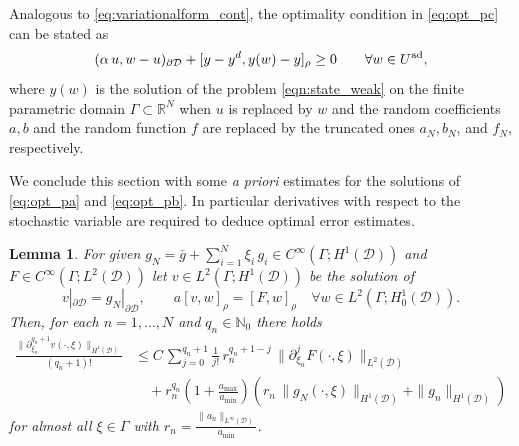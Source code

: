 \documentclass[a4paper,10pt]{article}
\newcommand{\cD}{{\mathcal{D}}}
\newtheorem{lemma}[theorem]{Lemma}
\numberwithin{theorem}{section}
\begin{document}
Analogous to \eqref{eq:variationalform_cont}, the optimality condition in \eqref{eq:opt_pc} can be stated as
\begin{equation}\label{eq:variationalform_parametric}
    ( \alpha \, u, w-u)_{\partial \cD} + [y-y^d, y(w) - y]_{\rho}  \geq 0 \qquad \forall w \in U^{\textup{ad}},
\end{equation}
where $y(w)$ is the solution of the problem \eqref{eqn:state_weak} on the finite parametric domain $\Gamma \subset \mathbb{R}^N$ when $u$ is replaced by $w$ and the random coefficients $a, b$ and the random function $f$ are replaced by the truncated ones  $a_N, b_N$, and $f_N$, respectively.

We conclude this section with some \emph{a priori} estimates for the solutions of \eqref{eq:opt_pa} and \eqref{eq:opt_pb}. In particular derivatives with respect to the stochastic variable are required to deduce optimal error estimates.
\begin{lemma}
  \label{lem:regularity_derivatives_xi}
  For given $g_N= \bar g + \sum_{i=1}^N\xi_i\,g_i\in C^\infty(\Gamma; H^1(\cD))$ and $F\in C^\infty(\Gamma; L^2(\cD))$ let $v\in L^2(\Gamma; H^1(\cD))$ be the solution of
  \begin{equation}\label{eq:general_bvp}
    v|_{\partial \cD} = g_N|_{\partial \cD},\qquad a[v,w]_\rho = [F,w]_\rho\quad \forall w\in L^2(\Gamma; H_0^1(\cD)).
  \end{equation}
  Then, for each $n=1,\ldots,N$ and $q_n\in \mathbb N_0$ there holds 
  \begin{align*}
    \frac{\|\partial_{\xi_n}^{q_n+1} v(\cdot,\xi)\|_{H^1(\cD)}}{(q_n + 1)!}
    &\le C\,\sum_{j=0}^{q_n+1} \frac{1}{j!}\,r_n^{q_n+1-j}\,\|\partial_{\xi_n}^j F(\cdot,\xi)\|_{L^2(\cD)} \\
    &\quad + r_n^{q_n}(1+\frac{a_{\max}}{a_{\min}})\left(r_n\,\|g_N(\cdot,\xi)\|_{H^1(\cD)} + \|g_n\|_{H^1(\cD)}\right)
  \end{align*}
   for almost all $\xi\in \Gamma$ with $r_n = \frac{\|a_n\|_{L^\infty( \cD)}}{a_{\min}}$.
\end{lemma}
\end{document}
